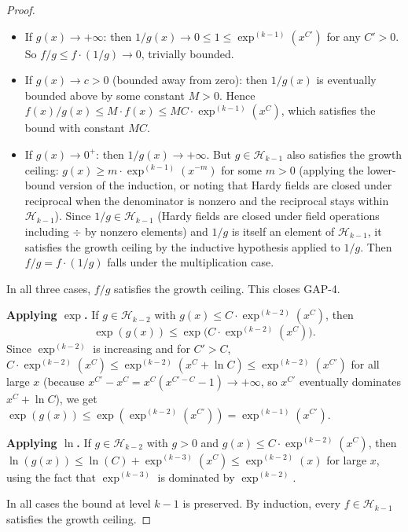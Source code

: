 \documentclass[12pt,a4paper]{article}
\theoremstyle{definition}
\theoremstyle{remark}
\begin{document}
\begin{proof}
\begin{itemize}
  \item If $g(x) \to +\infty$: then $1/g(x) \to 0 \leq 1 \leq \exp^{(k-1)}(x^{C'})$
        for any $C' > 0$.  So $f/g \leq f \cdot (1/g) \to 0$, trivially bounded.

  \item If $g(x) \to c > 0$ (bounded away from zero): then $1/g(x)$ is
        eventually bounded above by some constant $M > 0$.  Hence
        $f(x)/g(x) \leq M \cdot f(x) \leq MC \cdot \exp^{(k-1)}(x^C)$,
        which satisfies the bound with constant $MC$.

  \item If $g(x) \to 0^+$: then $1/g(x) \to +\infty$.  But $g \in \mathcal{H}_{k-1}$
        also satisfies the growth ceiling: $g(x) \geq m \cdot \exp^{(k-1)}(x^{-m})$
        for some $m > 0$ (applying the lower-bound version of the induction, or noting
        that Hardy fields are closed under reciprocal when the denominator is nonzero
        and the reciprocal stays within $\mathcal{H}_{k-1}$).  Since
        $1/g \in \mathcal{H}_{k-1}$ (Hardy fields are closed under field operations
        including $\div$ by nonzero elements) and $1/g$ is itself an element of
        $\mathcal{H}_{k-1}$, it satisfies the growth ceiling by the inductive hypothesis
        applied to $1/g$.  Then $f/g = f \cdot (1/g)$ falls under the multiplication case.
\end{itemize}

In all three cases, $f/g$ satisfies the growth ceiling.  This closes GAP-4.

\medskip
\noindent\textbf{Applying $\exp$.}
If $g \in \mathcal{H}_{k-2}$ with $g(x) \leq C \cdot \exp^{(k-2)}(x^C)$, then
\[
  \exp(g(x)) \leq \exp\bigl(C \cdot \exp^{(k-2)}(x^C)\bigr).
\]
Since $\exp^{(k-2)}$ is increasing and for $C' > C$,
$C \cdot \exp^{(k-2)}(x^C) \leq \exp^{(k-2)}(x^C + \ln C) \leq \exp^{(k-2)}(x^{C'})$
for all large $x$ (because $x^{C'} - x^C = x^C(x^{C'-C}-1) \to +\infty$, so
$x^{C'}$ eventually dominates $x^C + \ln C$), we get
$\exp(g(x)) \leq \exp(\exp^{(k-2)}(x^{C'})) = \exp^{(k-1)}(x^{C'})$.

\medskip
\noindent\textbf{Applying $\ln$.}
If $g \in \mathcal{H}_{k-2}$ with $g > 0$ and $g(x) \leq C \cdot \exp^{(k-2)}(x^C)$, then
$\ln(g(x)) \leq \ln(C) + \exp^{(k-3)}(x^C) \leq \exp^{(k-2)}(x)$ for large $x$,
using the fact that $\exp^{(k-3)}$ is dominated by $\exp^{(k-2)}$.

In all cases the bound at level $k-1$ is preserved.  By induction, every
$f \in \mathcal{H}_{k-1}$ satisfies the growth ceiling.
\end{proof}
\end{document}
